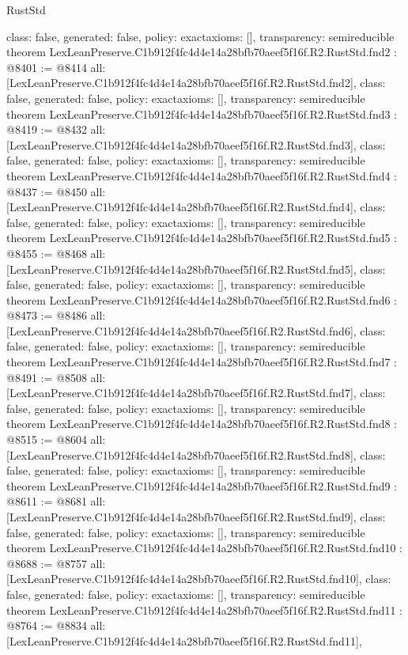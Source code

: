 \begin{lexlean}{RustStd}
\begin{coremodule}
{  class: false,
  generated: false,
  policy: exact{axioms: []},
  transparency: semireducible
}
theorem LexLeanPreserve.C1b912f4fc4d4e14a28bfb70aeef5f16f.R2.RustStd.fnd2 : @8401 := @8414 {
  all: [LexLeanPreserve.C1b912f4fc4d4e14a28bfb70aeef5f16f.R2.RustStd.fnd2],
  class: false,
  generated: false,
  policy: exact{axioms: []},
  transparency: semireducible
}
theorem LexLeanPreserve.C1b912f4fc4d4e14a28bfb70aeef5f16f.R2.RustStd.fnd3 : @8419 := @8432 {
  all: [LexLeanPreserve.C1b912f4fc4d4e14a28bfb70aeef5f16f.R2.RustStd.fnd3],
  class: false,
  generated: false,
  policy: exact{axioms: []},
  transparency: semireducible
}
theorem LexLeanPreserve.C1b912f4fc4d4e14a28bfb70aeef5f16f.R2.RustStd.fnd4 : @8437 := @8450 {
  all: [LexLeanPreserve.C1b912f4fc4d4e14a28bfb70aeef5f16f.R2.RustStd.fnd4],
  class: false,
  generated: false,
  policy: exact{axioms: []},
  transparency: semireducible
}
theorem LexLeanPreserve.C1b912f4fc4d4e14a28bfb70aeef5f16f.R2.RustStd.fnd5 : @8455 := @8468 {
  all: [LexLeanPreserve.C1b912f4fc4d4e14a28bfb70aeef5f16f.R2.RustStd.fnd5],
  class: false,
  generated: false,
  policy: exact{axioms: []},
  transparency: semireducible
}
theorem LexLeanPreserve.C1b912f4fc4d4e14a28bfb70aeef5f16f.R2.RustStd.fnd6 : @8473 := @8486 {
  all: [LexLeanPreserve.C1b912f4fc4d4e14a28bfb70aeef5f16f.R2.RustStd.fnd6],
  class: false,
  generated: false,
  policy: exact{axioms: []},
  transparency: semireducible
}
theorem LexLeanPreserve.C1b912f4fc4d4e14a28bfb70aeef5f16f.R2.RustStd.fnd7 : @8491 := @8508 {
  all: [LexLeanPreserve.C1b912f4fc4d4e14a28bfb70aeef5f16f.R2.RustStd.fnd7],
  class: false,
  generated: false,
  policy: exact{axioms: []},
  transparency: semireducible
}
theorem LexLeanPreserve.C1b912f4fc4d4e14a28bfb70aeef5f16f.R2.RustStd.fnd8 : @8515 := @8604 {
  all: [LexLeanPreserve.C1b912f4fc4d4e14a28bfb70aeef5f16f.R2.RustStd.fnd8],
  class: false,
  generated: false,
  policy: exact{axioms: []},
  transparency: semireducible
}
theorem LexLeanPreserve.C1b912f4fc4d4e14a28bfb70aeef5f16f.R2.RustStd.fnd9 : @8611 := @8681 {
  all: [LexLeanPreserve.C1b912f4fc4d4e14a28bfb70aeef5f16f.R2.RustStd.fnd9],
  class: false,
  generated: false,
  policy: exact{axioms: []},
  transparency: semireducible
}
theorem LexLeanPreserve.C1b912f4fc4d4e14a28bfb70aeef5f16f.R2.RustStd.fnd10 : @8688 := @8757 {
  all: [LexLeanPreserve.C1b912f4fc4d4e14a28bfb70aeef5f16f.R2.RustStd.fnd10],
  class: false,
  generated: false,
  policy: exact{axioms: []},
  transparency: semireducible
}
theorem LexLeanPreserve.C1b912f4fc4d4e14a28bfb70aeef5f16f.R2.RustStd.fnd11 : @8764 := @8834 {
  all: [LexLeanPreserve.C1b912f4fc4d4e14a28bfb70aeef5f16f.R2.RustStd.fnd11],
}
\end{coremodule}
\end{lexlean}
